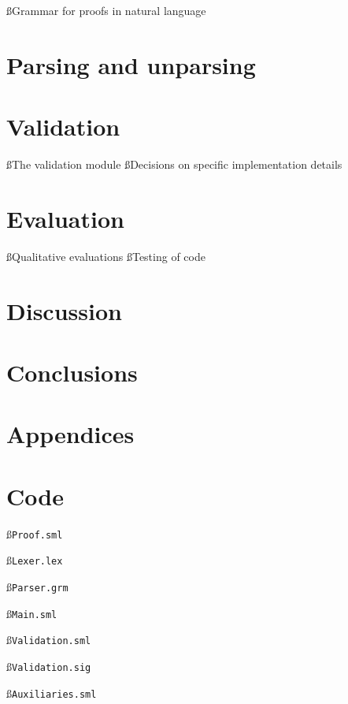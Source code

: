 \documentclass[a4paper]{article}
\begin{document}
\ss{Grammar for proofs in natural language}\label{nlgram}


\section{Parsing and unparsing}


\section{Validation}
\ss{The validation module}
\ss{Decisions on specific implementation details}

\section{Evaluation}
\ss{Qualitative evaluations}
\ss{Testing of code}

\section{Discussion}

\section{Conclusions}


\label{LastBody}
\pagebreak
{}


\label{LastBio}
\pagebreak
\appendix
{}
\section*{Appendices}\label{FirstApp}
\renewcommand \thesubsection{\alph{subsection}}
\section{Code}\label{code}
\ss{\tt{Proof.sml}}\label{Proof}

\ss{\tt{Lexer.lex}}\label{Lexer}

\ss{\tt{Parser.grm}}\label{Parser}

\ss{\tt{Main.sml}}\label{Main}

\ss{\tt{Validation.sml}}\label{Validation.sml}

\ss{\tt{Validation.sig}}\label{Validation.sig}

\ss{\tt{Auxiliaries.sml}}\label{Auxiliaries}

\label{LastApp}
\label{LastPage}
\end{document}
